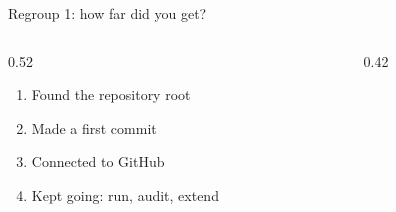 \begin{frame}{Regroup 1: how far did you get?}
  \vfill
  \begin{columns}[c]
    \begin{column}{0.52\textwidth}
      \begin{enumerate}\setlength\itemsep{0.45em}
        \item Found the repository root
        \item Made a first commit
        \item Connected to GitHub
        \item Kept going: run, audit, extend
      \end{enumerate}
    \end{column}
    \begin{column}{0.42\textwidth}
      \par\vspace{1.5em}\noindent
      \par\vspace{1.5em}\noindent
    \end{column}
  \end{columns}
  \vfill
\end{frame}
